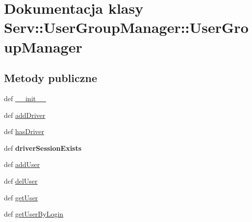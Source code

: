 \hypertarget{class_serv_1_1_user_group_manager_1_1_user_group_manager}{
\section{Dokumentacja klasy Serv::UserGroupManager::UserGroupManager}
\label{class_serv_1_1_user_group_manager_1_1_user_group_manager}
}
\subsection*{Metody publiczne}
\begin{DoxyCompactItemize}
\item 
def \hyperlink{class_serv_1_1_user_group_manager_1_1_user_group_manager_af43f9798f1e93dd8425699ecd6de6c87}{\_\-\_\-init\_\-\_\-}
\item 
def \hyperlink{class_serv_1_1_user_group_manager_1_1_user_group_manager_aea0f7f8d1d6e4d5efce31f3d0ea35fd9}{addDriver}
\item 
def \hyperlink{class_serv_1_1_user_group_manager_1_1_user_group_manager_a39ae7245da0bcda25ce712d1b55f2f29}{hasDriver}
\item 
\hypertarget{class_serv_1_1_user_group_manager_1_1_user_group_manager_a2911282f4333a88387427c1563649a52}{
def {\bfseries driverSessionExists}}
\label{class_serv_1_1_user_group_manager_1_1_user_group_manager_a2911282f4333a88387427c1563649a52}

\item 
def \hyperlink{class_serv_1_1_user_group_manager_1_1_user_group_manager_a46ee225566738a93c7c036b464a931fb}{addUser}
\item 
def \hyperlink{class_serv_1_1_user_group_manager_1_1_user_group_manager_a4b747272c8166d17b9458b3f8c4796f0}{delUser}
\item 
def \hyperlink{class_serv_1_1_user_group_manager_1_1_user_group_manager_a94bccb5702d504f5b782ba2379aaaab4}{getUser}
\item 
def \hyperlink{class_serv_1_1_user_group_manager_1_1_user_group_manager_aed20d08470748f78a641e6cc5700b505}{getUserByLogin}
\end{DoxyCompactItemize}
